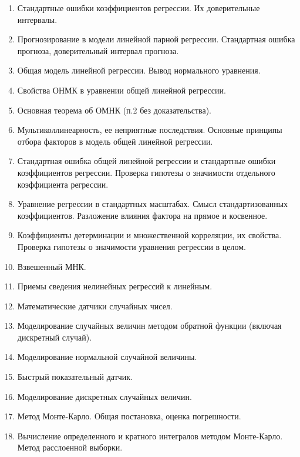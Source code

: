 \begin{enumerate}
    \item Стандартные ошибки коэффициентов регрессии. Их доверительные интервалы.
    \item Прогнозирование в модели линейной парной регрессии. Стандартная ошибка прогноза, доверительный интервал прогноза.
    \item Общая модель линейной регрессии. Вывод нормального уравнения.
    \item Свойства ОНМК в уравнении общей линейной регрессии.
    \item Основная теорема об ОМНК (п.2 без доказательства).
    \item Мультиколлинеарность, ее неприятные последствия. Основные принципы отбора факторов в модель общей линейной регрессии.
    \item Стандартная ошибка общей линейной регрессии и стандартные ошибки коэффициентов регрессии. Проверка гипотезы о значимости отдельного коэффициента регрессии.
    \item Уравнение регрессии в стандартных масштабах. Смысл стандартизованных коэффициентов. Разложение влияния фактора на прямое и косвенное.
    \item Коэффициенты детерминации и множественной корреляции, их свойства. Проверка гипотезы о значимости уравнения регрессии в целом.
    \item Взвешенный МНК.
    \item Приемы сведения нелинейных регрессий к линейным.
    \item Математические датчики случайных чисел.
    \item Моделирование случайных величин методом обратной функции (включая дискретный случай).
    \item Моделирование нормальной случайной величины.
    \item Быстрый показательный датчик.
    \item Моделирование дискретных случайных величин.
    \item Метод Монте-Карло. Общая постановка, оценка погрешности.
    \item Вычисление определенного и кратного интегралов методом Монте-Карло. Метод расслоенной выборки.
\end{enumerate}
